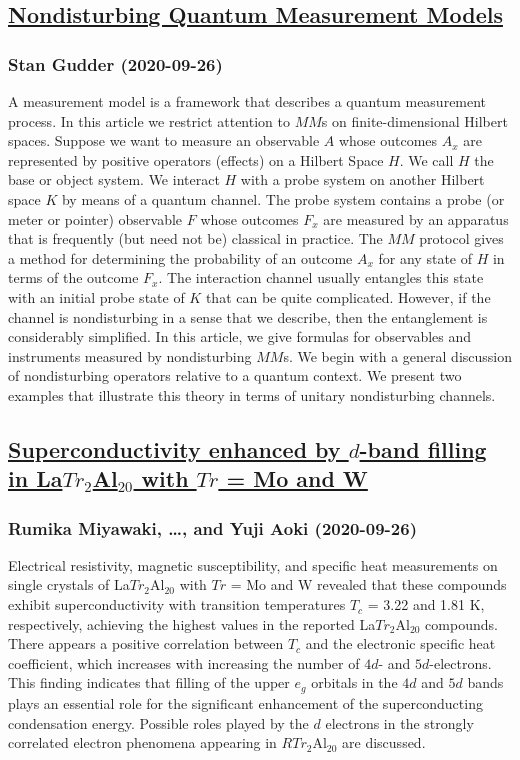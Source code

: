 \subsection*{\href{http://arxiv.org/abs/2009.12655v1}{Nondisturbing Quantum Measurement Models}}
\subsubsection*{Stan Gudder (2020-09-26)}
A measurement model is a framework that describes a quantum measurement
process. In this article we restrict attention to $MM$s on finite-dimensional
Hilbert spaces. Suppose we want to measure an observable $A$ whose outcomes
$A_x$ are represented by positive operators (effects) on a Hilbert Space $H$.
We call $H$ the base or object system. We interact $H$ with a probe system on
another Hilbert space $K$ by means of a quantum channel. The probe system
contains a probe (or meter or pointer) observable $F$ whose outcomes $F_x$ are
measured by an apparatus that is frequently (but need not be) classical in
practice. The $MM$ protocol gives a method for determining the probability of
an outcome $A_x$ for any state of $H$ in terms of the outcome $F_x$. The
interaction channel usually entangles this state with an initial probe state of
$K$ that can be quite complicated. However, if the channel is nondisturbing in
a sense that we describe, then the entanglement is considerably simplified. In
this article, we give formulas for observables and instruments measured by
nondisturbing $MM$s. We begin with a general discussion of nondisturbing
operators relative to a quantum context. We present two examples that
illustrate this theory in terms of unitary nondisturbing channels.

\subsection*{\href{http://arxiv.org/abs/2009.13952v1}{Superconductivity enhanced by $d$-band filling in La$Tr_2$Al$_{20}$ with  $Tr$ = Mo and W}}
\subsubsection*{Rumika Miyawaki, \dots, and Yuji Aoki (2020-09-26)}
Electrical resistivity, magnetic susceptibility, and specific heat
measurements on single crystals of La$Tr_2$Al$_{20}$ with $Tr$ = Mo and W
revealed that these compounds exhibit superconductivity with transition
temperatures $T_c$ = 3.22 and 1.81 K, respectively, achieving the highest
values in the reported La$Tr_2$Al$_{20}$ compounds. There appears a positive
correlation between $T_c$ and the electronic specific heat coefficient, which
increases with increasing the number of $4d$- and $5d$-electrons. This finding
indicates that filling of the upper $e_g$ orbitals in the $4d$ and $5d$ bands
plays an essential role for the significant enhancement of the superconducting
condensation energy. Possible roles played by the $d$ electrons in the strongly
correlated electron phenomena appearing in $RTr_{2}$Al$_{20}$ are discussed.

